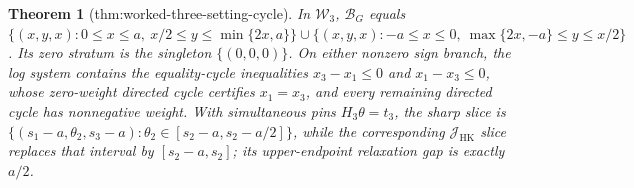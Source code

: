 \documentclass{article}
\newtheorem{theorem}{Theorem}
\begin{document}
\begin{theorem}[thm:worked-three-setting-cycle]\label{thm:worked-three-setting-cycle}
In \(\mathcal W_3\), \(\mathcal B_G\) equals \(\{(x,y,x):0\le x\le a,\ x/2\le y\le\min\{2x,a\}\}\cup\{(x,y,x):-a\le x\le0,\ \max\{2x,-a\}\le y\le x/2\}\). Its zero stratum is the singleton \(\{(0,0,0)\}\). On either nonzero sign branch, the log system contains the equality-cycle inequalities \(x_3-x_1\le0\) and \(x_1-x_3\le0\), whose zero-weight directed cycle certifies \(x_1=x_3\), and every remaining directed cycle has nonnegative weight. With simultaneous pins \(H_3\theta=t_3\), the sharp slice is \(\{(s_1-a,\theta_2,s_3-a):\theta_2\in[s_2-a,s_2-a/2]\}\), while the corresponding \(\mathcal J_{\mathrm{HK}}\) slice replaces that interval by \([s_2-a,s_2]\); its upper-endpoint relaxation gap is exactly \(a/2\).
\end{theorem}
\end{document}
